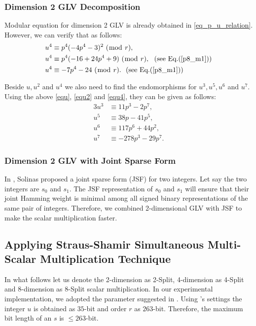 \subsubsection{Dimension 2 GLV Decomposition}
Modular equation for dimension 2 GLV is already obtained in \eqref{eq_p_u_relation}.
However, we can verify that as follows:
\begin{alignat}{3}
u^4 &\equiv p^4(-4p^4-3)^2~(\bmod~r), \nonumber \\
u^4 &\equiv p^4(-16+24p^4+9)~(\bmod~r),  ~~(\text{see~Eq.}(\ref{p8_m1})) \nonumber \\
u^4 &\equiv -7p^4-24~(\bmod~r). ~~(\text{see~Eq.}(\ref{p8_m1})) \label{equ4}
\end{alignat}

Beside $u, u^2$ and $u^4$ we also need to find the endomorphisms for $u^3, u^5, u^6$ and $u^7$.
Using the above \eqref{equ}, \eqref{equ2} and \eqref{equ4}, they can be given as follows:
\begin{alignat}{3}
u^3 & \equiv  11p^3-2p^7, \nonumber \\
u^5 & \equiv 38p -41p^5,\nonumber \\
u^6 & \equiv  117p^6+44p^2, \nonumber \\
u^7 & \equiv  -278p^3 -29p^7. \nonumber 
\end{alignat}

\subsubsection{Dimension 2 GLV with Joint Sparse Form}
In \cite{solinas2001JFS}, Solinas proposed a joint sparse form (JSF) for two integers. 
Let say the two integers are $s_0$ and $s_1$. 
The JSF representation of $s_0$ and $s_1$ will ensure that their joint Hamming weight is minimal among all signed binary representations of the same pair of integers. 
Therefore, we combined 2-dimensional GLV with JSF to make the scalar multiplication faster.

\subsection{Applying Straus-Shamir Simultaneous Multi-Scalar Multiplication Technique}
In what follows let us denote the 2-dimension as 2-Split, 4-dimension as 4-Split
and 8-dimension as 8-Split scalar multiplication.
In our experimental implementation, we adopted the parameter suggested in \cite{EPRINT:BarDuq17}. 
Using \cite{EPRINT:BarDuq17}'s settings the integer  $u$ is obtained as $35$-bit and order $r$ as $263$-bit. 
Therefore, the maximum bit length of an $s$ is $\leq 263$-bit.
